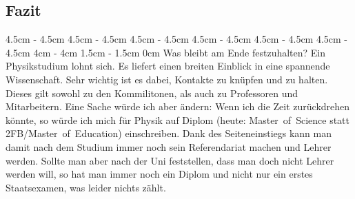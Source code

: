 \begin{multicols*}{2}
\subsection*{\hspace{4.5cm}Fazit}
4.5cm \dimexpr\columnwidth - 4.5cm
4.5cm \dimexpr\columnwidth - 4.5cm
4.5cm \dimexpr\columnwidth - 4.5cm
4.5cm \dimexpr\columnwidth - 4.5cm
4.5cm \dimexpr\columnwidth - 4.5cm
4.5cm \dimexpr\columnwidth - 4.5cm
4cm \dimexpr\columnwidth - 4cm
1.5cm \dimexpr\columnwidth - 1.5cm
0cm \columnwidth
Was bleibt am Ende festzuhalten? Ein Physikstudium lohnt sich. Es liefert einen breiten Einblick in eine spannende Wissenschaft. Sehr wichtig ist es dabei, Kontakte zu knüpfen und zu halten. Dieses gilt sowohl zu den Kommilitonen, als auch zu Professoren und Mitarbeitern. Eine Sache würde ich aber ändern: Wenn ich die Zeit zurückdrehen könnte, so würde ich mich für Physik auf Diplom (heute: Master~of~Science statt 2FB/Master~of~Education) einschreiben. Dank des Seiteneinstiegs kann man damit nach dem Studium immer noch sein Referendariat machen und Lehrer werden. Sollte man aber nach der Uni feststellen, dass man doch nicht Lehrer werden will, so hat man immer noch ein Diplom und nicht nur ein erstes Staatsexamen, was leider nichts zählt.

\begin{center}
\Large{}
\end{center}

\end{multicols*}
